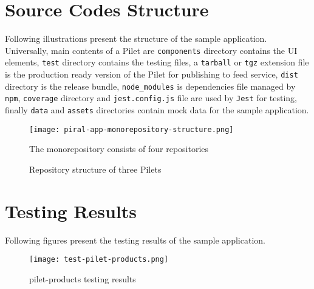 \documentclass[a4paper]{book}
\begin{document}
\begin{appendix}
\chapter{Source Codes Structure}
Following illustrations present the structure of the sample application. Universally, main contents of a Pilet are \verb|components| directory contains the UI elements, \verb|test| directory contains the testing files, a \verb|tarball| or \verb|tgz| extension file is the production ready version of the Pilet for publishing to feed service, \verb|dist| directory is the release bundle, \verb|node_modules| is dependencies file managed by \verb|npm|, \verb|coverage| directory and \verb|jest.config.js| file are used by \verb|Jest| for testing, finally \verb|data| and \verb|assets| directories contain mock data for the sample application.

\begin{figure}[h!]
  \centering
  \captionsetup{justification=centering}
  \texttt{[image: piral-app-monorepository-structure.png]}
  \caption{The monorepository consists of four repositories}
  \label{fig:1}
\end{figure}

\begin{figure}[h!]
    \centering
    \captionsetup{justification=centering}
    \hspace*{0.1\hsize}
    \hspace*{0.1\hsize}
    \caption{Repository structure of three Pilets}
    \label{fig:monorepositroy}
\end{figure}

\chapter{Testing Results}  %

Following figures present the testing results of the sample application.

\begin{figure}[h!]
    \centering
    \captionsetup{justification=centering}
    \caption{pilet-products testing results}
    {\texttt{[image: test-pilet-products.png]}}
\end{figure}


\end{appendix}
\end{document}
